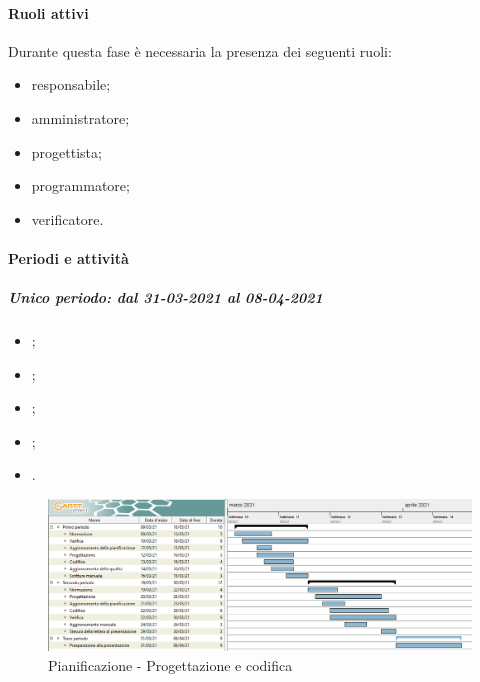 \paragraph{Ruoli attivi}
Durante questa fase è necessaria la presenza dei seguenti ruoli: 
\begin{itemize} 
	\item responsabile; 
	\item amministratore; 
	\item progettista; 
	\item programmatore; 
	\item verificatore.
\end{itemize}

\paragraph{Periodi e attività}
\subparagraph{Unico periodo: dal 31-03-2021 al 08-04-2021}
\begin{itemize}
	\item ;
	\item ;
	\item ;
	\item ;
	\item .
\end{itemize}
 
\newpage 

\begin{landscape} 
	\begin{figure}[h!] 
		\includegraphics[width=24cm]{images/4_Progettazione_e_codifica.png} 
		\caption{Pianificazione - Progettazione e codifica} 
	\end{figure} 
\end{landscape} 

\newpage 

 
 